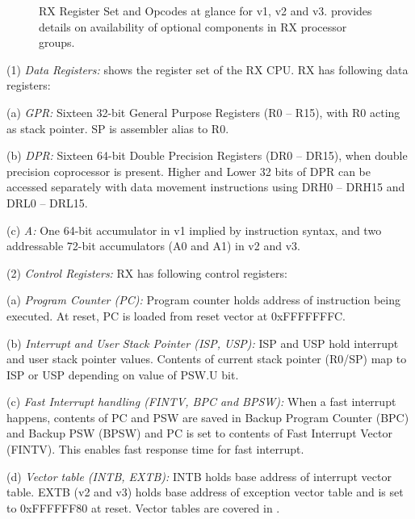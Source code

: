 \begin{figure}
\captionsetup{font=scriptsize, labelfont=scriptsize}
\caption{RX Register Set and Opcodes at glance for v1, v2 and v3. \protect{}
provides details on availability of optional components in RX processor groups.}
\end{figure}


\SOPNoteBody

(1) \emph{Data Registers:} %
 shows the register set of the RX CPU. RX has following data registers:

    \leveltwo
    (a) \emph{GPR:} %
    Sixteen 32-bit General Purpose Registers (R0 -- R15), with R0 acting as stack pointer. SP is 
    assembler alias to R0.

    (b) \emph{DPR:} %
    Sixteen 64-bit Double Precision Registers (DR0 -- DR15), when double precision coprocessor is present.
    Higher and Lower 32 bits of DPR can be accessed separately with data movement instructions using 
    DRH0 -- DRH15 and DRL0 -- DRL15.

    (c) \emph{A:} %
    One 64-bit accumulator in v1 implied by instruction syntax, and two addressable 72-bit accumulators 
    (A0 and A1) in v2 and v3.

\levelone
(2) \emph{Control Registers:} %
RX has following control registers:

    \leveltwo
    (a) \emph{Program Counter (PC):} %
    Program counter holds address of instruction being executed. At reset, PC is loaded from reset 
    vector at 0xFFFFFFFC.

    (b) \emph{Interrupt and User Stack Pointer (ISP, USP):} %
    ISP and USP hold interrupt and user stack pointer values. Contents of current stack pointer (R0/SP)
    map to ISP or USP depending on value of PSW.U bit.

    (c) \emph{Fast Interrupt handling (FINTV, BPC and BPSW):} %
    When a fast interrupt happens, contents of PC and PSW are saved in Backup Program Counter (BPC) 
    and Backup PSW (BPSW) and PC is set to contents of Fast Interrupt Vector (FINTV). This enables 
    fast response time for fast interrupt.

    (d) \emph{Vector table (INTB, EXTB):} %
    INTB holds base address of interrupt vector table. EXTB (v2 and v3) holds base address of 
    exception vector table and is set to 0xFFFFFF80 at reset. Vector tables are covered in 
    .

